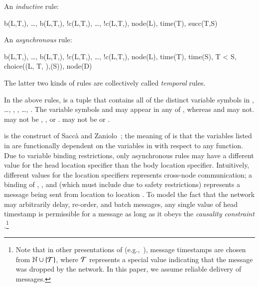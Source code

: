 An {\em inductive} rule:

\begin{Drules}
        {b(L,T,), \ldots, b(L,T,), !c(L,T,), \ldots, !c(L,T,), node(L), time(T), succ(T,S)}
\end{Drules}

An {\em asynchronous} rule:

\begin{Drules}
        {b(L,T,), \ldots, b(L,T,),
          !c(L,T,), \ldots, !c(L,T,),
          node(L), time(T), time(S), T < S, choice((L, T, ),(S)), node(D)}
\end{Drules}

The latter two kinds of rules are collectively called {\em temporal} rules.

In the above rules,  is a tuple that contains all of the distinct variable
symbols in , \ldots, , , \ldots,
.  The variable symbols  and  may appear in
any of , whereas  and  may not.
 may not be , , or .
 may not be
 or .

 is the construct of Sacc\`{a} and Zaniolo~\cite{sacca-zaniolo};
the meaning of  is that the variables listed
in  are functionally dependent on the variables in  with respect to
any function.  Due to variable binding restrictions, only asynchronous rules may
have a different value for the head location specifier than the body location
specifier.  Intuitively, different values for the location specifiers represents
cross-node communication; a binding of , , and 
(which must include  due to safety restrictions) represents a message
being sent from location  to location .  To model the fact
that the network may arbitrarily delay, re-order, and batch messages, any single
value of head timestamp  is permissible for a message as long as it
obeys the {\em causality constraint} .\footnote{Note that in
  other presentations of \lang (e.g.,~\cite{dedalus}), message timestamps are
  chosen from $\mathbb{N} \cup \{\Tau\}$, where $\Tau$ represents a special value
  indicating that the message was dropped by the network. In this paper, we
  assume reliable delivery of messages.}

